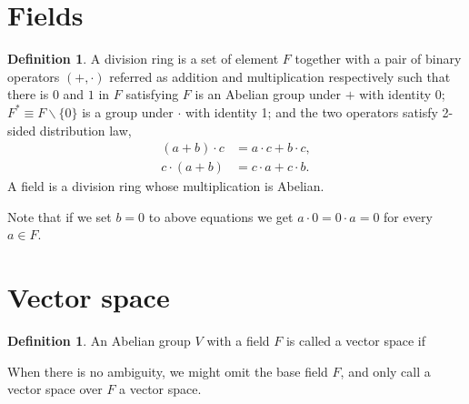 \documentclass{amsbook}
\theoremstyle{definition}
\newtheorem{definition}[theorem]{Definition}
\theoremstyle{remark}
\newtheorem{remark}[theorem]{Remark}
\numberwithin{section}{chapter}
\numberwithin{equation}{chapter}
\begin{document}
\section{Fields}
\begin{definition}
	A division ring is a set of element $F$ together with a pair of binary operators $(+, \cdot)$ referred as addition and multiplication respectively such that there is $0$ and $1$ in $F$ satisfying $F$ is an Abelian group under $+$ with identity 0; $F^*\equiv F\backslash\{0\}$ is a group under $\cdot$ with identity 1; and the two operators satisfy 2-sided distribution law,
	\begin{equation*}
	\begin{split}
	(a + b)\cdot c &= a\cdot c + b\cdot c,\\
	c\cdot (a + b) &= c\cdot a + c\cdot b.
	\end{split}
	\end{equation*}
	A field is a division ring whose multiplication is Abelian.
\end{definition}
Note that if we set $b = 0$ to above equations we get $a\cdot0 = 0\cdot a = 0$ for every $a\in F$.
\section{Vector space}
\begin{definition}
	An Abelian group $V$ with a field $F$ is called a vector space if
\end{definition}
When there is no ambiguity, we might omit the base field $F$, and only call a vector space over $F$ a vector space.
\end{document}
